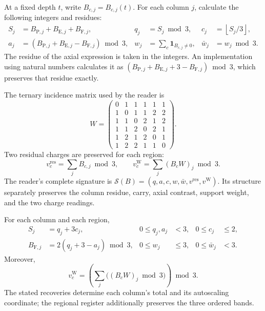 
At a fixed depth \(t\), write \(B_{c,j}=B_{c,j}(t)\). For each column
\(j\), calculate the following integers and residues:
\begin{align}
 S_j&=B_{\mathrm P,j}+B_{\mathrm E,j}+B_{\mathrm F,j},
 &q_j&=S_j\bmod3,
 &c_j&=\left\lfloor S_j/3\right\rfloor,
 \label{eq:df-firma-qc}\\
 a_j&=(B_{\mathrm P,j}+B_{\mathrm E,j}-B_{\mathrm F,j})\bmod3,
 &w_j&=\sum_c\mathbf1_{B_{c,j}\ne0},
 &\bar w_j&=w_j\bmod3.
 \label{eq:df-firma-axial}
\end{align}
The residue of the axial expression is taken in the integers. An
implementation using natural numbers calculates it as
\((B_{\mathrm P,j}+B_{\mathrm E,j}+3-B_{\mathrm F,j})\bmod3\),
which preserves that residue exactly.

The ternary incidence matrix used by the reader is
\begin{equation}
 W=\begin{pmatrix}
0&1&1&1&1&1\\
1&0&1&1&2&2\\
1&1&0&2&1&2\\
1&1&2&0&2&1\\
1&2&1&2&0&1\\
1&2&2&1&1&0
\end{pmatrix}.
\label{eq:df-matriz-witt}
\end{equation}
Two residual charges are preserved for each region:
\begin{equation}
 v_c^{\mathrm{res}}=\sum_j B_{c,j}\bmod3,
 \qquad
 v_c^{\mathrm W}=\sum_j(B_cW)_j\bmod3.
 \label{eq:df-cargas-residuales}
\end{equation}
The reader's complete signature is
\(\mathcal S(B)=(q,a,c,w,\bar w,v^{\mathrm{res}},v^{\mathrm W})\).
Its structure separately preserves the column residue, carry, axial
contrast, support weight, and the two charge readings.

\begin{theorem}
\label{thm:df-recuperacion-firma}
For each column and each region,
\begin{align}
 S_j&=q_j+3c_j,&0\leq q_j,a_j&<3,&0\leq c_j&\leq2,
 \label{eq:df-recuperacion-total}\\
 B_{\mathrm F,j}&=2(q_j+3-a_j)\bmod3,&0\leq w_j&\leq3,
 &0\leq\bar w_j&<3.
 \label{eq:df-recuperacion-eje}
\end{align}
Moreover,
\begin{equation}
 v_c^{\mathrm W}
 =\left(\sum_j\bigl((B_cW)_j\bmod3\bigr)\right)\bmod3.
 \label{eq:df-witt-reduccion}
\end{equation}
The stated recoveries determine each column's total and its autoscaling
coordinate; the regional register additionally preserves the three
ordered bands.
\end{theorem}


